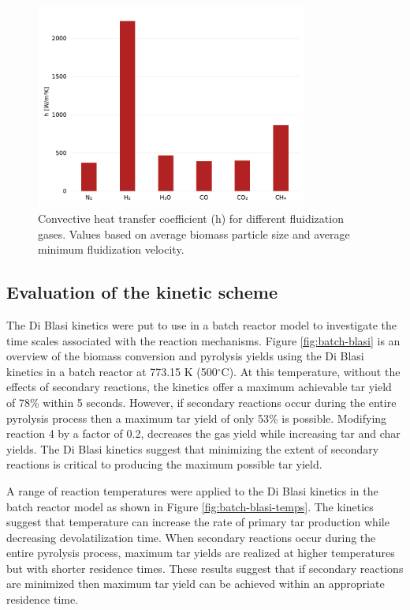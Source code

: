 \begin{figure}[H]
    \centering
    \includegraphics[width=0.8\textwidth]{figures/biomass_hconv.pdf}
    \caption{Convective heat transfer coefficient (h) for different fluidization gases. Values based on average biomass particle size and average minimum fluidization velocity.}
    \label{fig:biomass-hconv}
\end{figure}


\subsection{Evaluation of the kinetic scheme}

The Di Blasi kinetics were put to use in a batch reactor model to investigate the time scales associated with the reaction mechanisms. Figure \ref{fig:batch-blasi} is an overview of the biomass conversion and pyrolysis yields using the Di Blasi kinetics in a batch reactor at 773.15 K (500$^\circ$C). At this temperature, without the effects of secondary reactions, the kinetics offer a maximum achievable tar yield of 78\% within 5 seconds. However, if secondary reactions occur during the entire pyrolysis process then a maximum tar yield of only 53\% is possible. Modifying reaction 4 by a factor of 0.2, decreases the gas yield while increasing tar and char yields. The Di Blasi kinetics suggest that minimizing the extent of secondary reactions is critical to producing the maximum possible tar yield.

A range of reaction temperatures were applied to the Di Blasi kinetics in the batch reactor model as shown in Figure \ref{fig:batch-blasi-temps}. The kinetics suggest that temperature can increase the rate of primary tar production while decreasing devolatilization time. When secondary reactions occur during the entire pyrolysis process, maximum tar yields are realized at higher temperatures but with shorter residence times. These results suggest that if secondary reactions are minimized then maximum tar yield can be achieved within an appropriate residence time.


